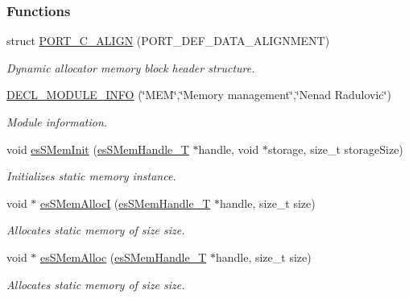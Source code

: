 \subsubsection*{Functions}
\begin{DoxyCompactItemize}
\item 
struct \hyperlink{group__mem__impl_ga4314f62895ea8335b19545c0f6a74e34}{P\-O\-R\-T\-\_\-\-C\-\_\-\-A\-L\-I\-G\-N} (P\-O\-R\-T\-\_\-\-D\-E\-F\-\_\-\-D\-A\-T\-A\-\_\-\-A\-L\-I\-G\-N\-M\-E\-N\-T)
\begin{DoxyCompactList}\small\item\em Dynamic allocator memory block header structure. \end{DoxyCompactList}\item 
\hyperlink{group__mem__impl_gade934104528d9fb269eb5aef4041daca}{D\-E\-C\-L\-\_\-\-M\-O\-D\-U\-L\-E\-\_\-\-I\-N\-F\-O} (\char`\"{}M\-E\-M\char`\"{},\char`\"{}Memory management\char`\"{},\char`\"{}Nenad Radulovic\char`\"{})
\begin{DoxyCompactList}\small\item\em Module information. \end{DoxyCompactList}\item 
void \hyperlink{group__mem__impl_ga53acef4ba27e5e401ac2e1f862e07a8b}{es\-S\-Mem\-Init} (\hyperlink{group__mem__intf_gabf19a317cc22713cfb45ae1e43d34d7e}{es\-S\-Mem\-Handle\-\_\-\-T} $\ast$handle, void $\ast$storage, size\-\_\-t storage\-Size)
\begin{DoxyCompactList}\small\item\em Initializes static memory instance. \end{DoxyCompactList}\item 
void $\ast$ \hyperlink{group__mem__impl_ga2e2086778aa0eb21156044730a1f380b}{es\-S\-Mem\-Alloc\-I} (\hyperlink{group__mem__intf_gabf19a317cc22713cfb45ae1e43d34d7e}{es\-S\-Mem\-Handle\-\_\-\-T} $\ast$handle, size\-\_\-t size)
\begin{DoxyCompactList}\small\item\em Allocates static memory of size {\ttfamily size}. \end{DoxyCompactList}\item 
void $\ast$ \hyperlink{group__mem__impl_ga23c0a40e0c40dabed8c22d9d65709c65}{es\-S\-Mem\-Alloc} (\hyperlink{group__mem__intf_gabf19a317cc22713cfb45ae1e43d34d7e}{es\-S\-Mem\-Handle\-\_\-\-T} $\ast$handle, size\-\_\-t size)
\begin{DoxyCompactList}\small\item\em Allocates static memory of size {\ttfamily size}. \end{DoxyCompactList}\item 

\end{DoxyCompactItemize}
